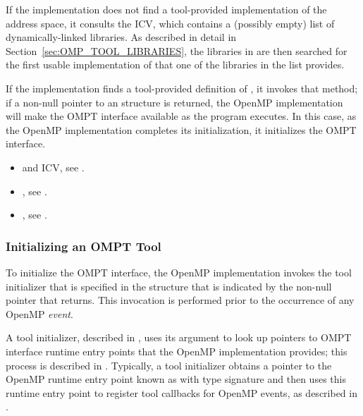 If the implementation does not find a tool-provided implementation of 
 the address space, it consults the  
ICV, which contains a (possibly empty) list of dynamically-linked libraries. As 
described in detail in Section~\ref{sec:OMP_TOOL_LIBRARIES}, the libraries in
 are then searched for the first usable implementation 
of  that one of the libraries in the list provides.

If the implementation finds a tool-provided definition of ,
it invokes that method; if a non-null pointer to an  
structure is returned, the OpenMP implementation will make the OMPT interface 
available as the program executes. In this case, as the OpenMP implementation 
completes its initialization, it initializes the OMPT interface.

\crossreferences
\begin{itemize}
\item {} and  ICV, see .
\item {}, see .
\item {}, see .
\end{itemize}

\subsubsection{Initializing an OMPT Tool}
\label{sec:tool-initialize}

To initialize the OMPT interface, the OpenMP implementation invokes the tool 
initializer that is specified in the  structure
that is indicated by the non-null pointer that  returns.
This invocation is performed prior to the occurrence of any OpenMP \emph{event}.

A tool initializer, described in , uses its 
argument  to look up pointers to OMPT interface runtime entry points 
that the OpenMP implementation provides; this process is described in 
. Typically, a tool initializer obtains a pointer to the 
OpenMP runtime entry point known as  with type signature
 and then uses this runtime entry point to register tool 
callbacks for OpenMP events, as described in .

